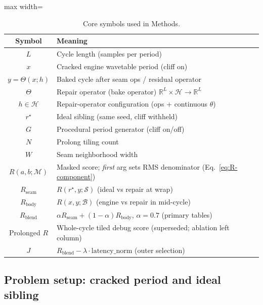 \begin{table}[t]
  \centering
  \caption{Core symbols used in Methods.}
  \label{tab:symbols}
  \setlength{\tabcolsep}{3pt}
  \begin{adjustbox}{max width=\columnwidth}
\begin{tabular}{@{}cl@{}}
    \toprule
    Symbol & Meaning \\
    \midrule
    $L$ & Cycle length (samples per period) \\
    $x$ & Cracked engine wavetable period (cliff on) \\
    $y=\Theta(x;h)$ & Baked cycle after seam ops / residual operator \\
    $\Theta$ & Repair operator (bake operator) $\mathbb{R}^{L}\times\mathcal{H}\to\mathbb{R}^{L}$ \\
    $h\in\mathcal{H}$ & Repair-operator configuration (ops + continuous $\theta$) \\
    $r^{\star}$ & Ideal sibling (same seed, cliff withheld) \\
    $G$ & Procedural period generator (cliff on/off) \\
    $N$ & Prolong tiling count \\
    $W$ & Seam neighborhood width \\
    $R(a,b;\mathcal{M})$ & Masked score; \emph{first} arg sets RMS denominator (Eq.~\eqref{eq:R-component}) \\
    $R_{\mathrm{seam}}$ & $R(r^{\star},y;\mathcal{S})$ (ideal vs repair at wrap) \\
    $R_{\mathrm{body}}$ & $R(x,y;\mathcal{B})$ (engine vs repair in mid-cycle) \\
    $R_{\mathrm{blend}}$ & $\alpha R_{\mathrm{seam}}+(1-\alpha)R_{\mathrm{body}}$, $\alpha{=}0.7$ (primary tables) \\
    Prolonged $R$ & Whole-cycle tiled debug score (superseded; ablation left column) \\
    $J$ & $R_{\mathrm{blend}}-\lambda\cdot\mathrm{latency\_norm}$ (outer selection) \\
    \bottomrule
  \end{tabular}
\end{adjustbox}
\end{table}

\subsection{Problem setup: cracked period and ideal sibling}
\label{sec:ideal-tile}

